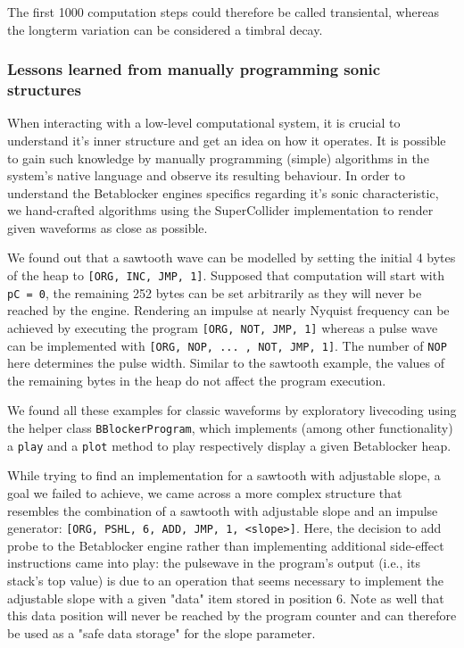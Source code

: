 \documentclass[letterpaper, 12pt]{article}
\begin{document}
The first 1000 computation steps could therefore be called transiental, whereas the longterm variation can be considered a timbral decay.

\subsubsection{Lessons learned from manually programming sonic structures}
\label{sub:manual_programming_sonic_structures}

When interacting with a low-level computational system, it is crucial to  understand it's inner structure and get an idea on how it operates.
It is possible to gain such knowledge by manually programming (simple) algorithms in the system's native language and observe its resulting behaviour.
In order to understand the Betablocker engines specifics regarding it's sonic characteristic, we hand-crafted algorithms using the SuperCollider implementation to render given waveforms as close as possible.

We found out that a sawtooth wave can be modelled by setting the initial 4 bytes of the heap to
\texttt{[ORG, INC, JMP, 1]}.
Supposed that computation will start with \texttt{pC = 0}, the remaining 252 bytes can be set arbitrarily as they will never be reached by the engine.
Rendering an impulse at nearly Nyquist frequency can be achieved by executing the program \texttt{[ORG, NOT, JMP, 1]} whereas a pulse wave can be implemented with \texttt{[ORG, NOP, ... , NOT, JMP, 1]}.
The number of \texttt{NOP} here determines the pulse width.
Similar to the sawtooth example, the values of the remaining bytes in the heap do not affect the program execution.

We found all these examples for classic waveforms by exploratory livecoding using the helper class \texttt{BBlockerProgram}, which implements (among other functionality) a \texttt{play} and a \texttt{plot} method to play respectively display a given Betablocker heap.

While trying to find an implementation for a sawtooth with adjustable slope, a goal we failed to achieve, we came across a more complex structure that resembles the combination of a sawtooth with adjustable slope and an impulse generator: \texttt{[ORG, PSHL, 6, ADD, JMP, 1, <slope>]}. 
Here, the decision to add probe to the Betablocker engine rather than implementing additional side-effect instructions came into play: the pulsewave in the program's output (i.e., its stack's top value) is due to an operation that seems necessary to implement the adjustable slope with a given "data" item stored in position 6.
Note as well that this data position will never be reached by the program counter and can therefore be used as a "safe data storage" for the slope parameter.
\end{document}
